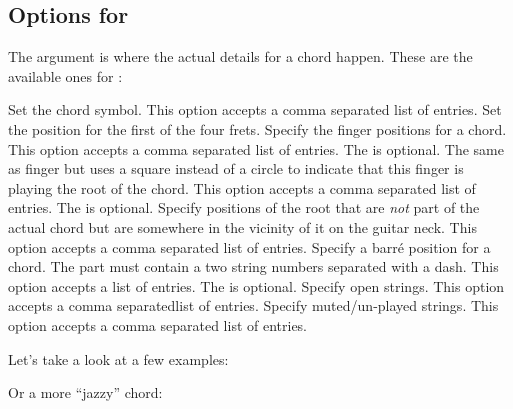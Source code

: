 \documentclass[load-preamble+]{cnltx-doc}
\begin{document}
\subsection{Options for }
The  argument is where the actual details for a chord
happen. These are the available ones for :
\begin{options}
    Set the chord symbol. This option accepts a comma separated list of
    entries.
    Set the position for the first of the four frets.
    Specify the finger positions for a chord.  This option accepts a comma
    separated list of entries.  The  is optional.
    The same as finger but uses a square instead of a circle to indicate that
    this finger is playing the root of the chord.  This option accepts a comma
    separated list of  entries. The  is optional.
    Specify positions of the root that are \emph{not} part of the actual chord
    but are somewhere in the vicinity of it on the guitar neck.  This option
    accepts a comma separated list of entries.
    Specify a barr\'e position for a chord.  The  part must
    contain a two string numbers separated with a dash.  This option accepts a
    list of entries. The  is optional.
    Specify open strings.  This option accepts a comma separatedlist of
    entries.
    Specify muted/un-played strings.  This option accepts a comma separated
    list of entries.
\end{options}

Let's take a look at a few examples:

\begin{example}
  \chordscheme[
    name      = G ,
    position  = I ,
    finger    = {2/5:1} ,
    root      = {3/6:2, 3/1:4} ,
    ring      = {2,3,4}
  ]
\end{example}
\makeatletter
{}
\makeatother

Or a more "`jazzy"' chord:
\begin{example}
  \chordscheme[
    name      = G\textsuperscript{6} ,
    position  = II ,
    finger    = {1/4:1, 3/3:4, 2/2:3} ,
    root      = 2/6:2 ,
    show-root = 4/4 ,
    mute      = {1,5}
  ]
\end{example}
\end{document}
